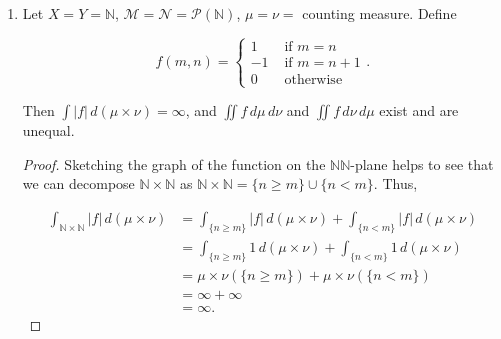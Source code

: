 \documentclass[11pt,oneside,english]{amsart}
\theoremstyle{definition}
\newcommand{\MC}[1]{\mathcal{#1}}
\begin{document}
\begin{enumerate}
\begin{proof}
\begin{align*}
\int \chi_D(x,y)\,d(\mu\times\nu)(x,y)&=\mu\times\nu(D)\\[2mm]
&=\inf\left\{\sum_{n=1}^\infty\mu(A_n)\nu(B_n)\,\Big|\,(A_n\times B_n)\in\MC{A},\,D\subset\bigcup_{n=1}^\infty(A_n\times B_n)\right\}.
\end{align*}

For any covering $\{A_n\times B_n\}$ of $D$, $\{B_n\}$ is a covering of $Y=[0,1]$. $\nu([0,1])>0$, so $\nu\left(\bigcup B_n)\right)>0$, which implies that $\nu(B_n)>0$ for at least one $n$. Since $B_n$ is a rectangle in $Y$ with positive measure, it must be an interval, and therefore $\nu(B_n)=\infty$. Since our covering was chosen arbitrarily, such a $B_n$ appears in any covering of $D$, and thus

\[
\int \chi_D\,d(\mu\times\nu)=\inf\left\{\sum_{n=1}^\infty\mu(A_n)\nu(B_n)\,\Big|\,(A_n\times B_n)\in\MC{A},\,D\subset\bigcup_{n=1}^\infty(A_n\times B_n)\right\}=\inf\{\infty\}=\infty.
\]

\end{proof}

\setcounter{enumi}{47}

\item Let $X=Y=\mathbb{N}$, $\MC{M}=\MC{N}=\MC{P}(\mathbb{N})$, $\mu=\nu=$ counting measure. Define 

\[
f(m,n)=\begin{cases}1 & \text{ if }m=n\\ -1 & \text{ if } m=n+1\\ 0 & \text{ otherwise}\end{cases}.
\]

Then $\displaystyle \int |f|\,d(\mu \times \nu)=\infty$, and $\iint f \,d\mu\,d\nu$ and $\iint f \,d\nu\,d\mu$ exist and are unequal.

\begin{proof}
Sketching the graph of the function on the $\mathbb{N}\mathbb{N}$-plane helps to see that we can decompose $\mathbb{N}\times \mathbb{N}$ as $\mathbb{N}\times \mathbb{N}=\{n\geq m\}\cup\{n< m\}$. Thus,

\begin{align*}
\int_{\mathbb{N}\times \mathbb{N}}|f|\,d(\mu\times \nu)&=\int_{\{n\geq m\}}|f|\,d(\mu\times \nu)+\int_{\{n<m\}}|f|\,d(\mu\times \nu)\\[2mm]
&=\int_{\{n\geq m\}}1\,d(\mu\times \nu)+\int_{\{n<m\}}1\,d(\mu\times \nu)\\[2mm]
&=\mu\times\nu(\{n\geq m\})+\mu\times\nu(\{n<m\})\\[2mm]
&=\infty +\infty \\[2mm]
&=\infty.
\end{align*}


\end{proof}
\end{enumerate}
\end{document}
